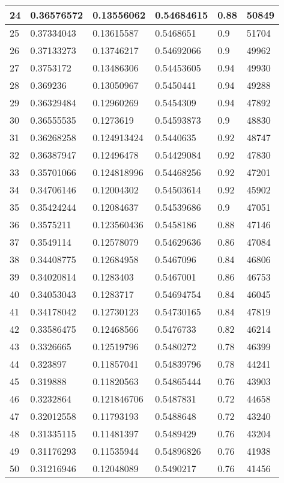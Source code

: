 \begin{longtable}{|l|l|l|l|l|l|}
24 & 0.36576572 & 0.13556062 & 0.54684615 & 0.88 & 50849 \\ \hline 
25 & 0.37334043 & 0.13615587 & 0.5468651 & 0.9 & 51704 \\ \hline 
26 & 0.37133273 & 0.13746217 & 0.54692066 & 0.9 & 49962 \\ \hline 
27 & 0.3753172 & 0.13486306 & 0.54453605 & 0.94 & 49930 \\ \hline 
28 & 0.369236 & 0.13050967 & 0.5450441 & 0.94 & 49288 \\ \hline 
29 & 0.36329484 & 0.12960269 & 0.5454309 & 0.94 & 47892 \\ \hline 
30 & 0.36555535 & 0.1273619 & 0.54593873 & 0.9 & 48830 \\ \hline 
31 & 0.36268258 & 0.124913424 & 0.5440635 & 0.92 & 48747 \\ \hline 
32 & 0.36387947 & 0.12496478 & 0.54429084 & 0.92 & 47830 \\ \hline 
33 & 0.35701066 & 0.124818996 & 0.54468256 & 0.92 & 47201 \\ \hline 
34 & 0.34706146 & 0.12004302 & 0.54503614 & 0.92 & 45902 \\ \hline 
35 & 0.35424244 & 0.12084637 & 0.54539686 & 0.9 & 47051 \\ \hline 
36 & 0.3575211 & 0.123560436 & 0.5458186 & 0.88 & 47146 \\ \hline 
37 & 0.3549114 & 0.12578079 & 0.54629636 & 0.86 & 47084 \\ \hline 
38 & 0.34408775 & 0.12684958 & 0.5467096 & 0.84 & 46806 \\ \hline 
39 & 0.34020814 & 0.1283403 & 0.5467001 & 0.86 & 46753 \\ \hline 
40 & 0.34053043 & 0.1283717 & 0.54694754 & 0.84 & 46045 \\ \hline 
41 & 0.34178042 & 0.12730123 & 0.54730165 & 0.84 & 47819 \\ \hline 
42 & 0.33586475 & 0.12468566 & 0.5476733 & 0.82 & 46214 \\ \hline 
43 & 0.3326665 & 0.12519796 & 0.5480272 & 0.78 & 46399 \\ \hline 
44 & 0.323897 & 0.11857041 & 0.54839796 & 0.78 & 44241 \\ \hline 
45 & 0.319888 & 0.11820563 & 0.54865444 & 0.76 & 43903 \\ \hline 
46 & 0.3232864 & 0.121846706 & 0.5487831 & 0.72 & 44658 \\ \hline 
47 & 0.32012558 & 0.11793193 & 0.5488648 & 0.72 & 43240 \\ \hline 
48 & 0.31335115 & 0.11481397 & 0.5489429 & 0.76 & 43204 \\ \hline 
49 & 0.31176293 & 0.11535944 & 0.54896826 & 0.76 & 41938 \\ \hline 
50 & 0.31216946 & 0.12048089 & 0.5490217 & 0.76 & 41456 \\ \hline 
\end{longtable}